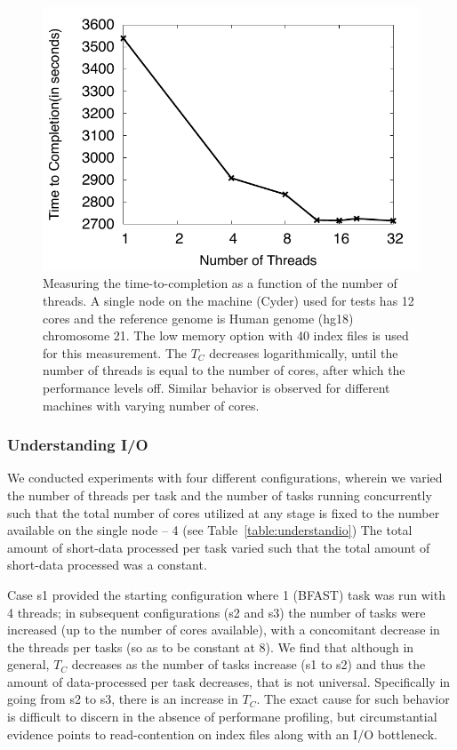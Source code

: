 \documentclass{cpeauth}
\begin{document}
 \begin{figure}
 \centering
\includegraphics[bb=0 0 340 300, scale=0.39]{figures/threadsvstime.pdf} 

\caption{\small Measuring the time-to-completion as a function of the
  number of threads.  A single node on the machine (Cyder) used for
  tests has 12 cores and the reference genome is Human genome (hg18)
  chromosome 21. The low memory option with 40 index files is used for
  this measurement. The $T_C$ decreases logarithmically, until the
  number of threads is equal to the number of cores, after which the
  performance levels off. Similar behavior is observed for different
  machines with varying number of cores.}
  \label{fig:threading-benchmark} 
 \end{figure}

\subsubsection{Understanding I/O}

We conducted experiments with four different configurations, wherein
we varied the number of threads per task and the number of tasks
running concurrently such that the total number of cores utilized at
any stage is fixed to the number available on the single node -- 4
(see Table~\ref{table:understandio}) The total amount of short-data
processed per task varied such that the total amount of short-data
processed was a constant.

Case s1 provided the starting configuration where 1 (BFAST) task was
run with 4 threads; in subsequent configurations (s2 and s3) the
number of tasks were increased (up to the number of cores available),
with a concomitant decrease in the threads per tasks (so as to be
constant at 8). We find that although in general, $T_C$ decreases as
the number of tasks increase (s1 to s2) and thus the amount of
data-processed per task decreases, that is not universal. Specifically
in going from s2 to s3, there is an increase in $T_C$.  The exact
cause for such behavior is difficult to discern in the absence of
performane profiling, but circumstantial evidence points to
read-contention on index files along with an I/O bottleneck.
\end{document}
